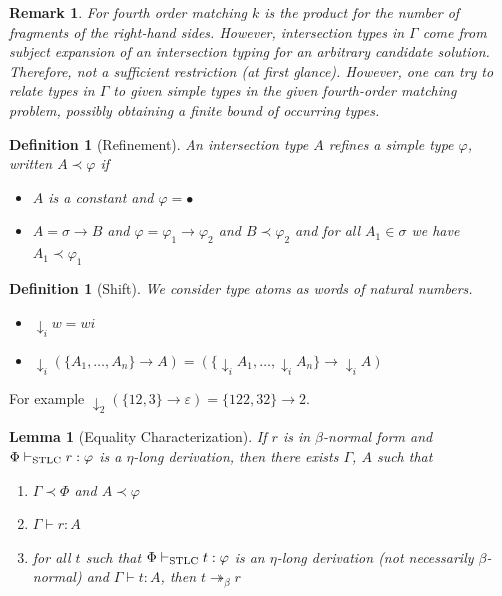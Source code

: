 \documentclass[10pt,a4paper]{article}
\theoremstyle{plain}%
\newtheorem{definition}[theorem]{Definition}
\newtheorem{lemma}[theorem]{Lemma}
\newtheorem{remark}[theorem]{Remark}
\begin{document}
\begin{remark}
For fourth order matching $k$ is the product for the number of fragments of the right-hand sides.
However, intersection types in $\Gamma$ come from subject expansion of an intersection typing for an arbitrary candidate solution.
Therefore, not a sufficient restriction (at first glance).
However, one can try to relate types in $\Gamma$ to given simple types in the given fourth-order matching problem, possibly obtaining a finite bound of occurring types.
\end{remark}

\begin{definition}[Refinement]
An intersection type $A$ refines a simple type $\varphi$, written $A \prec \varphi$ if
\begin{itemize}
\item $A$ is a constant and $\varphi = \bullet$
\item $A = \sigma \to B$ and $\varphi = \varphi_1 \to \varphi_2$ and $B \prec \varphi_2$ and for all $A_1 \in \sigma$ we have $A_1 \prec \varphi_1$ 
\end{itemize}
\end{definition}

\begin{definition}[Shift]
We consider type atoms as words of natural numbers.
\begin{itemize}
\item ${\downarrow_i}w = wi$
\item ${\downarrow_i}(\{A_1, \ldots, A_n\} \to A) = (\{{\downarrow_i}A_1, \ldots, {\downarrow_i}A_n\} \to {\downarrow_i}A)$
\end{itemize}
\end{definition}

For example ${\downarrow_2}(\{12, 3\} \to \varepsilon) = \{122, 32\} \to 2$.

\begin{lemma}[Equality Characterization]\label{lem:eq_character}
If $r$ is in $\beta$-normal form and $\Phi \vdash_{\textnormal{STLC}} r : \varphi$ is a $\eta$-long derivation, then there exists $\Gamma$, $A$ such that
\begin{enumerate}
\item $\Gamma \prec \Phi$ and $A \prec \varphi$
\item $\Gamma \vdash r : A$
\item for all $t$ such that $\Phi \vdash_{\textnormal{STLC}} t : \varphi$ is an $\eta$-long derivation (not necessarily $\beta$-normal) and $\Gamma \vdash t : A$, then $t \twoheadrightarrow_\beta r$
\end{enumerate}
\end{lemma}
\end{document}
